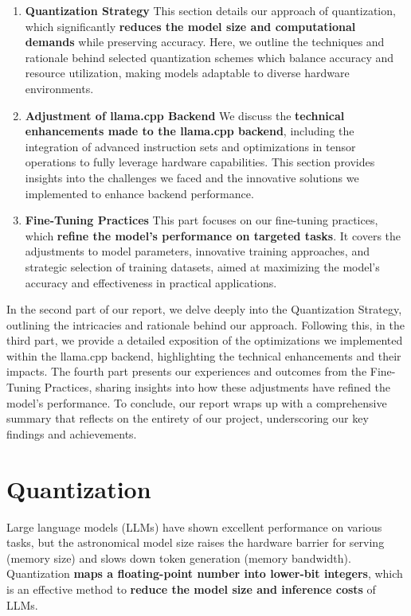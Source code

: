 \documentclass[conference]{IEEEtran}
\begin{document}
\begin{enumerate}
\item \textbf{Quantization Strategy}
This section details our approach of quantization, which significantly \textbf{reduces the model size and computational demands} while preserving accuracy. Here, we outline the techniques and rationale behind selected quantization schemes which balance accuracy and resource utilization, making models adaptable to diverse hardware environments.

\item \textbf{Adjustment of llama.cpp Backend}
We discuss the \textbf{technical enhancements made to the llama.cpp backend}, including the integration of advanced instruction sets and optimizations in tensor operations to fully leverage hardware capabilities. This section provides insights into the challenges we faced and the innovative solutions we implemented to enhance backend performance.

\item \textbf{Fine-Tuning Practices}
This part focuses on our fine-tuning practices, which \textbf{refine the model’s performance on targeted tasks}. It covers the adjustments to model parameters, innovative training approaches, and strategic selection of training datasets, aimed at maximizing the model's accuracy and effectiveness in practical applications.
\end{enumerate}

In the second part of our report, we delve deeply into the Quantization Strategy, outlining the intricacies and rationale behind our approach. Following this, in the third part, we provide a detailed exposition of the optimizations we implemented within the llama.cpp backend, highlighting the technical enhancements and their impacts. The fourth part presents our experiences and outcomes from the Fine-Tuning Practices, sharing insights into how these adjustments have refined the model's performance. To conclude, our report wraps up with a comprehensive summary that reflects on the entirety of our project, underscoring our key findings and achievements.

\section{Quantization}
Large language models (LLMs) have shown excellent performance on various tasks, but the astronomical model size raises the hardware barrier for serving (memory size) and slows down token generation (memory bandwidth). Quantization \textbf{maps a floating-point number into lower-bit integers}, which is an effective method to \textbf{reduce the model size and inference costs} of LLMs. 
\end{document}

